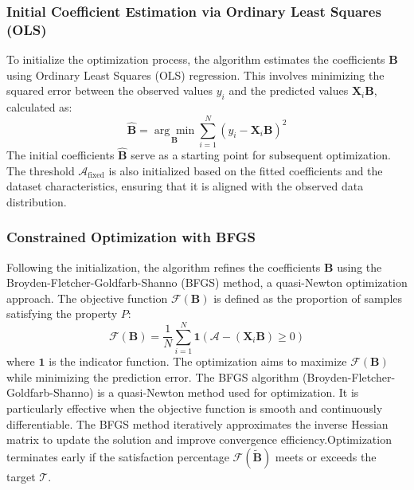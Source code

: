 \subsubsection{Initial Coefficient Estimation via Ordinary Least Squares (OLS)}
To initialize the optimization process, the algorithm estimates the coefficients \( \mathbf{B} \) using Ordinary Least Squares (OLS) regression. This involves minimizing the squared error between the observed values \( y_i \) and the predicted values \( \mathbf{X}_i \mathbf{B} \), calculated as:
\[
\hat{\mathbf{B}} = \underset{\mathbf{B}}{\arg\min} \sum_{i=1}^N \left( y_i - \mathbf{X}_i \mathbf{B} \right)^2
\]
The initial coefficients \( \hat{\mathbf{B}} \) serve as a starting point for subsequent optimization. The threshold \( \mathcal{A}_{\text{fixed}} \) is also initialized based on the fitted coefficients and the dataset characteristics, ensuring that it is aligned with the observed data distribution.

\subsubsection{Constrained Optimization with BFGS}
Following the initialization, the algorithm refines the coefficients \( \mathbf{B} \) using the Broyden-Fletcher-Goldfarb-Shanno (BFGS) method, a quasi-Newton optimization approach. The objective function \( \mathcal{F}(\mathbf{B}) \) is defined as the proportion of samples satisfying the property \( P \):
\[
\mathcal{F}(\mathbf{B}) = \frac{1}{N} \sum_{i=1}^N \mathbf{1}\left(\mathcal{A} - (\mathbf{X}_i \mathbf{B}) \geq 0 \right)
\]
where \( \mathbf{1} \) is the indicator function. The optimization aims to maximize \( \mathcal{F}(\mathbf{B}) \) while minimizing the prediction error. The BFGS algorithm (Broyden-Fletcher-Goldfarb-Shanno) is a quasi-Newton method used for optimization. It is particularly effective when the objective function is smooth and continuously differentiable. The BFGS method iteratively approximates the inverse Hessian matrix to update the solution and improve convergence efficiency.Optimization terminates early if the satisfaction percentage \( \mathcal{F}(\tilde{\mathbf{B}}) \) meets or exceeds the target \( \mathcal{T} \).


